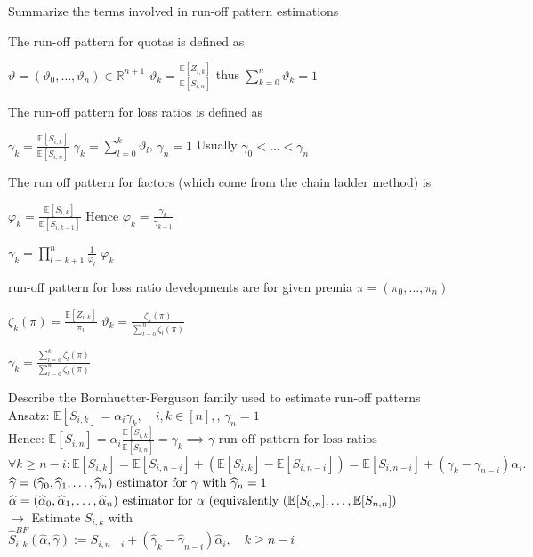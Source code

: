 \documentclass[11pt,a4paper,twoside]{article}
\begin{document}
Summarize the terms involved in run-off pattern estimations

The run-off pattern for quotas is defined as

\( \vartheta = (\vartheta_0, \dots, \vartheta_n) \in \mathbb{R}^{n+1} \)
\( \vartheta_k = \frac{\mathbb{E}[Z_{i,k}]}{\mathbb{E}[S_{i,n}]} \)
thus 
\( \sum_{k=0}^n \vartheta_k = 1 \)

The run-off pattern for loss ratios is defined as

\( \gamma_k = \frac{\mathbb{E}[S_{i,k}]}{\mathbb{E}[S_{i,n}]} \)
\( \gamma_k = \sum_{l=0}^k \vartheta_l \), \( \gamma_n = 1 \)
Usually \( \gamma_0 < \dots < \gamma_n \)

The run off pattern for factors (which come from the chain ladder method) is

\( \varphi_k = \frac{\mathbb{E}[S_{i,k}]}{\mathbb{E}[S_{i,k-1}]}  \)
Hence
\( \varphi_k = \frac{\gamma_k}{\gamma_{k-1}} \)

\( \gamma_k = \prod_{l=k+1}^n  \frac{1}{\varphi_l} \)
\( \varphi_k \)

run-off pattern for loss ratio developments are for given premia \( \pi = (\pi_0, \dots, \pi_n) \)

\( \zeta_k(\pi) = \frac{\mathbb{E}[Z_{i,k}]}{\pi_i} \)
\( \vartheta_k = \frac{\zeta_k(\pi)}{\sum_{l=0}^n \zeta_l(\pi)} \)

\( \gamma_k = \frac{\sum_{l=0}^k \zeta_l(\pi)}{\sum_{l=0}^n \zeta_l(\pi)} \)


Describe the Bornhuetter-Ferguson family used to estimate run-off patterns
Ansatz:
\(
\mathbb{E}[S_{i,k}] = \alpha_i \gamma_k, \quad i, k \in [n],
\),
\(
\gamma_n = 1
\)
\\
Hence:
\(
\mathbb{E}[S_{i,n}] = \alpha_i \frac{\mathbb{E}[S_{i,k}]}{\mathbb{E}[S_{i,n}]} = \gamma_k \implies \gamma \text{ run-off pattern for loss ratios}
\)
\\
\(
\forall k \ge n-i: \mathbb{E}[S_{i,k}] = \mathbb{E}[S_{i,n-i}] + (\mathbb{E}[S_{i,k}] - \mathbb{E}[S_{i,n-i}]) = \mathbb{E}[S_{i,n-i}] + (\gamma_k - \gamma_{n-i})\alpha_i.
\)
\\
\(\widehat{\gamma} = (\widehat{\gamma}_0, \widehat{\gamma}_1, \dots, \widehat{\gamma}_n)$ estimator for $\gamma$ with $\widehat{\gamma}_n = 1\)\\
\(\widehat{\alpha} = (\widehat{\alpha}_0, \widehat{\alpha}_1, \dots, \widehat{\alpha}_n)$ estimator for $\alpha$ (equivalently $(\mathbb{E}[S_{0,n}], \dots, \mathbb{E}[S_{n,n}])\) \\
\(\longrightarrow\) Estimate \(S_{i,k}\) with \\
\(
\widehat{S}_{i,k}^{BF}(\widehat{\alpha}, \widehat{\gamma}) := S_{i,n-i} + (\widehat{\gamma}_k - \widehat{\gamma}_{n-i})\widehat{\alpha}_i, \quad k \ge n-i
\)
\end{document}

